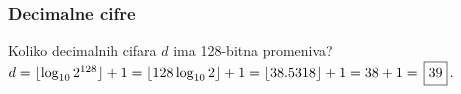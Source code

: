 \subsubsection{Decimalne cifre}
\zadatak Koliko decimalnih cifara $d$ ima 128-bitna promen{\lj}iva?
\resenje $d=\lfloor\logten 2^{128}\rfloor+1=\lfloor 128\logten 2\rfloor+1=\lfloor 38.5318\rfloor+1=38+1=\ram{39}.$
